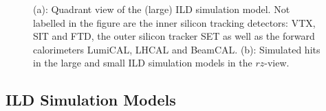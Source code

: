 \begin{figure}[b!]
\begin{subfigure}{0.60\hsize}
    \caption{ \label{fig:sim_hits_LS_rz}}
  \end{subfigure}
  \caption{\label{fig:sim_models}(a): Quadrant view of the (large) ILD simulation model. Not labelled in the figure are the inner
  silicon tracking detectors: VTX, SIT and FTD, the outer silicon tracker SET as well as the forward calorimeters LumiCAL, LHCAL and BeamCAL.
  (b): Simulated hits in the large and small ILD simulation models in the $rz$-view.
  }
\end{figure}



\subsection{\label{sec:det-models} ILD Simulation Models}

